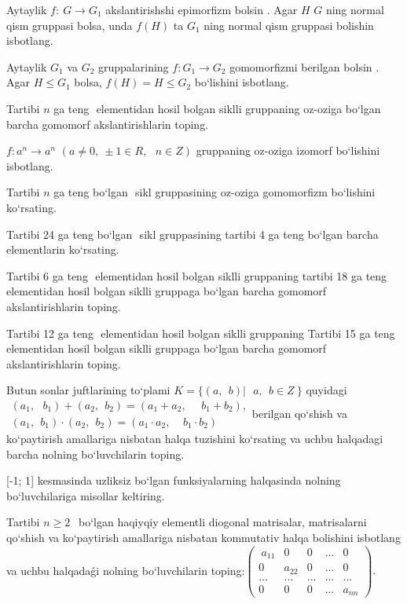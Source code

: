 Aytaylik \(f:\ G \rightarrow G_{1}\) akslantirishshi epimorfizm bo\textquotesingle lsin . Agar \(H\) \(G\) ning normal qism gruppasi bolsa, unda \(f(H)\) ta \(G_{1}\) ning normal qism gruppasi bolishin isbotlang.

Aytaylik \(G_{1}\) va \(G_{2}\) gruppalarining \(f:G_{1} \rightarrow G_{2}\) gomomorfizmi berilgan bo\textquotesingle lsin . Agar \(H \leq G_{1}\) bolsa, \(f(H) = H \leq G_{2}\) bo`lishini isbotlang.

Tartibi \(n\) ga teng \(< a >\) elementidan hosil bo\textquotesingle lgan siklli gruppaning o\textquotesingle z-o\textquotesingle ziga bo`lgan barcha gomomorf akslantirishlarin toping.

\(f:a^{n} \rightarrow a^{n}\) \((a \neq 0,\  \pm 1 \in R,\ \ \ n \in Z)\) gruppaning o\textquotesingle z-o\textquotesingle ziga izomorf bo`lishini isbotlang.

Tartibi \(n\) ga teng bo`lgan \(< a >\) sikl gruppasining o\textquotesingle z-o\textquotesingle ziga gomomorfizm bo`lishini ko`rsating.

Tartibi 24 ga teng bo`lgan \(< a >\) sikl gruppasining tartibi 4 ga teng bo`lgan barcha elementlarin ko`rsating.

Tartibi 6 ga teng \(< a >\) elementidan hosil bo\textquotesingle lgan siklli gruppaning tartibi 18 ga teng \(< b >\) elementidan hosil bo\textquotesingle lgan siklli gruppaga bo`lgan barcha gomomorf akslantirishlarin toping.

Tartibi 12 ga teng \(< a >\) elementidan hosil bo\textquotesingle lgan siklli gruppaning Tartibi 15 ga teng \(< b >\) elementidan hosil bo\textquotesingle lgan siklli gruppaga bo`lgan barcha gomomorf akslantirishlarin toping.

Butun sonlar juftlarining to`plami \(K = \{(a,\ \ b)\left| \ \ \ a,\ \ b \in Z \right.\ \}\) quyidagi \(\begin{matrix}
(a_{1},\ \ \ b_{1}) + (a_{2},\ \ b_{2}) = (a_{1} + a_{2},\ \ \ \ \ \ b_{1} + b_{2}), \\
(a_{1},\ \ b_{1}) \cdot (a_{2},\ \ b_{2}) = (a_{1} \cdot a_{2},\ \ \ \ \ b_{1} \cdot b_{2})
\end{matrix}\)berilgan qo`shish va ko`paytirish amallariga nisbatan halqa tuzishini ko`rsating va uchbu halqadagi barcha nolning bo`luvchilarin toping.

{[}-1; 1{]} kesmasinda uzliksiz bo`lgan funksiyalarning halqasinda nolning bo`luvchilariga misollar keltiring.

Tartibi \(n \geq 2\ \ \) bo`lgan haqiyqiy elementli diogonal matrisalar, matrisalarni qo`shish va ko`paytirish amallariga nisbatan kommutativ halqa bolishini isbotlang va uchbu halqadaǵi nolning bo`luvchilarin toping:\(\begin{pmatrix}
\ a_{11} & 0\ \  & 0 & ... & 0\ \  \\
0\ \  & a_{22} & 0 & ... & 0\ \  \\
... & ... & ... & ... & ... \\
0\ \  & 0\ \  & 0 & ... & a_{nn}
\end{pmatrix}.\)

